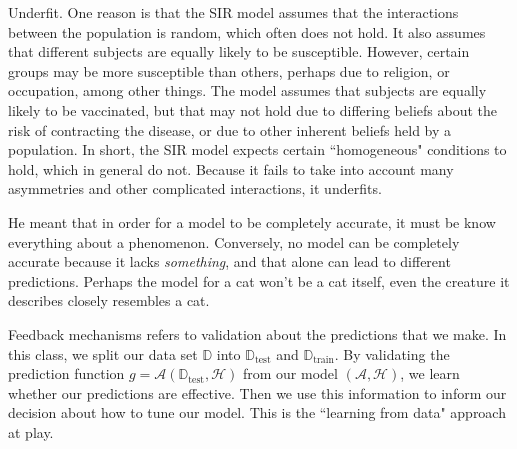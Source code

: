 \documentclass[12pt]{article}
\begin{document}
\begin{enumerate}

Underfit. One reason is that the SIR model assumes that the interactions between
the population is random, which often does not hold. It also assumes that
different subjects are equally likely to be susceptible. However, certain
groups may be more susceptible than others, perhaps due to religion, or
occupation, among other things. The model assumes that subjects are equally
likely to be vaccinated, but that may not hold due to differing beliefs
about the risk of contracting the disease, or due to other inherent beliefs
held by a population. In short, the SIR model expects certain ``homogeneous"
conditions to hold, which in general do not. Because it fails to take into account
many asymmetries and other complicated interactions, it underfits.


He meant that in order for a model to be completely accurate, it must be know everything
about a phenomenon. Conversely, no model can be completely accurate because it
lacks \textit{something}, and that alone can lead to different predictions. Perhaps
the model for a cat won't be a cat itself, even the creature it describes
closely resembles a cat.


Feedback mechanisms refers to validation about the predictions that
we make. In this class, we split our data set $\mathbb{D}$ into
$\mathbb{D}_{\text{test}}$ and $\mathbb{D}_{\text{train}}$. By validating
the prediction function $g = \mathcal{A}(\mathbb{D}_{\text{test}}, \mathcal{H})$ from
our model $(\mathcal{A},\mathcal{H})$, we learn whether our predictions
are effective. Then we use this information to inform our decision about
how to tune our model. This is the ``learning from data" approach at play.


\end{enumerate}
\end{document}
